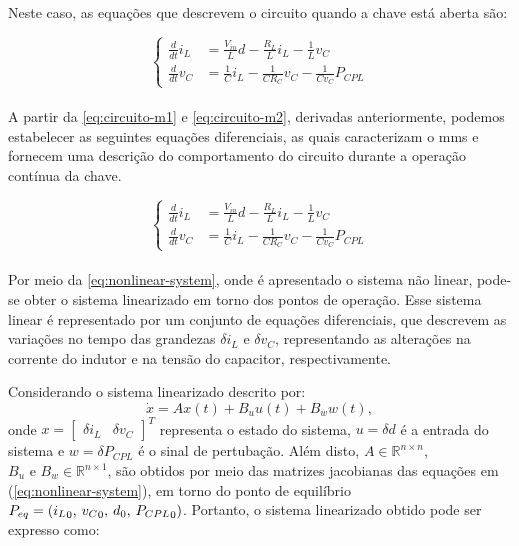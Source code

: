 Neste caso, as equações que descrevem o circuito quando a chave está aberta são:

\begin{equation}
  \begin{cases}
    \frac{d}{dt}i_L  & = \frac{V_{in}}{L} d - \frac{R_L}{L} i_L - \frac{1}{L} v_C        \\
    \frac{d}{dt} v_C & = \frac{1}{C} i_L - \frac{1}{C R_C} v_C - \frac{1}{C v_C} P_{CPL}
    \label{eq:circuito-m2}
  \end{cases}
\end{equation}
\\
A partir da \autoref{eq:circuito-m1} e \autoref{eq:circuito-m2}, derivadas anteriormente, podemos estabelecer as seguintes equações diferenciais, as quais caracterizam o \acrshort{mms} e fornecem uma descrição do comportamento do circuito durante a operação contínua da chave.

\begin{equation}
  \begin{cases}
    \frac{d}{dt}i_L  & = \frac{V_{in}}{L} d - \frac{R_L}{L} i_L - \frac{1}{L} v_C        \\
    \frac{d}{dt} v_C & = \frac{1}{C} i_L - \frac{1}{C R_C} v_C - \frac{1}{C v_C} P_{CPL}
    \label{eq:nonlinear-system}
  \end{cases}
\end{equation}
\\
\indent Por meio da \autoref{eq:nonlinear-system}, onde é apresentado o sistema não linear, pode-se obter o sistema linearizado em torno dos pontos de operação. Esse sistema linear é representado por um conjunto de equações diferenciais, que descrevem as variações no tempo das grandezas $\delta i_L$ e $\delta v_C$, representando as alterações na corrente do indutor e na tensão do capacitor, respectivamente.

Considerando o sistema linearizado descrito por: \begin{equation} \dot{x} = Ax(t) + B_uu(t) + B_ww(t), \end{equation} onde  $x = \begin{bmatrix} \delta i_L & \delta v_C \end{bmatrix} ^ T$ representa o estado do sistema, $u = \delta d$ é a entrada do sistema e $w = \delta P_{CPL}$ é o sinal de pertubação. Além disto, $A \in \mathbb{R}^{n \times n}$, $B_u \text{ e } B_w \in \mathbb{R}^{n \times 1}$, são obtidos por meio das matrizes jacobianas das equações em (\ref{eq:nonlinear-system}), em torno do ponto de equilíbrio $P_{eq} = ({i_L}_0, \hspace{0.07cm} {v_C}_0, \hspace{0.07cm} {d}_0, \hspace{0.07cm} {P_{CPL}}_0)$. Portanto, o sistema linearizado obtido pode ser expresso como:

